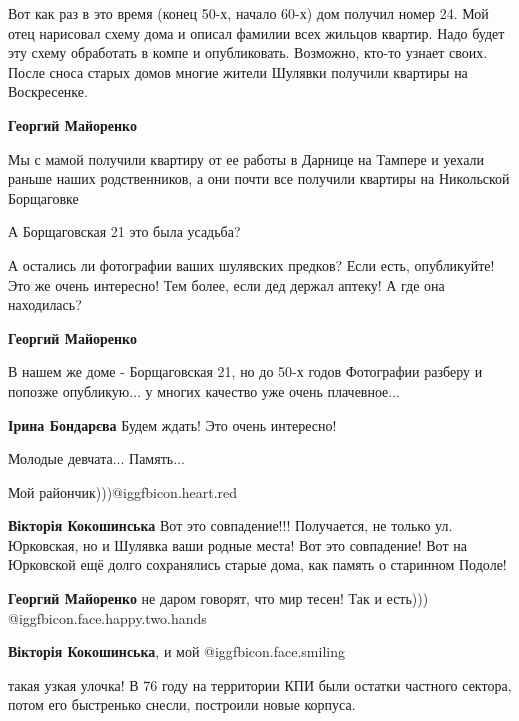 \begin{itemize}
\begin{itemize}
Вот как раз в это время (конец 50-х, начало 60-х) дом получил номер 24. Мой
отец нарисовал схему дома и описал фамилии всех жильцов квартир. Надо будет эту
схему обработать в компе и опубликовать. Возможно, кто-то узнает своих. После
сноса старых домов многие жители Шулявки получили квартиры на Воскресенке.


\textbf{Георгий Майоренко} 

Мы с мамой получили квартиру от ее работы в Дарнице на Тампере и уехали раньше
наших родственников, а они почти все получили квартиры на Никольской Борщаговке



А Борщаговская 21 это была усадьба?

\end{itemize} %


А остались ли фотографии ваших шулявских предков? Если есть, опубликуйте! Это
же очень интересно! Тем более, если дед держал аптеку! А где она находилась?

\begin{itemize} %
\textbf{Георгий Майоренко} 

В нашем же доме - Борщаговская 21, но до 50-х годов
Фотографии разберу и попозже опубликую... у многих качество уже очень плачевное...

\textbf{Ірина Бондарєва} Будем ждать! Это очень интересно!

\end{itemize} %

\end{itemize} %

Молодые девчата... Память...

Мой райончик)))@igg{fbicon.heart.red}

\begin{itemize} %
\textbf{Вікторія Кокошинська} Вот это совпадение!!! Получается, не только ул. Юрковская, но и Шулявка ваши родные места! Вот это совпадение! Вот на Юрковской ещё долго сохранялись старые дома, как память о старинном Подоле!

\textbf{Георгий Майоренко} не даром говорят, что мир тесен! Так и есть)))  @igg{fbicon.face.happy.two.hands} 

\textbf{Вікторія Кокошинська}, и мой @igg{fbicon.face.smiling}
\end{itemize} %


такая узкая улочка! В 76 году на территории КПИ были остатки частного сектора,
потом его быстренько снесли, построили новые корпуса.
